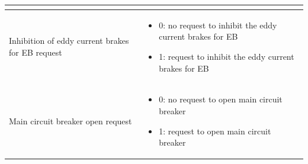 \documentclass[nocc]{template/openetcs_report}
\begin{document}
\begin{longtable}{|l|l|}
\begin{minipage}[t]{0.5\linewidth}
\begin{itemize}
						\end{itemize}
					\end{minipage} \\
				\hline
				\begin{minipage}[t]{0.5\linewidth} Inhibition of eddy current brakes for EB request	\end{minipage} 
				&	\begin{minipage}[t]{0.5\linewidth}
						\begin{itemize}
							\item 0: no request to inhibit the eddy current brakes for EB
							\item 1: request to inhibit the eddy current brakes for EB
						\end{itemize}
					\end{minipage} \\
				\hline				
				\begin{minipage}[t]{0.5\linewidth} Main circuit breaker open request	\end{minipage} 
				&	\begin{minipage}[t]{0.5\linewidth}
						\begin{itemize}
							\item 0: no request to open main circuit breaker
							\item 1: request to open main circuit breaker
						\end{itemize}
					\end{minipage} \\
				\hline
				

\end{longtable}
\end{document}

